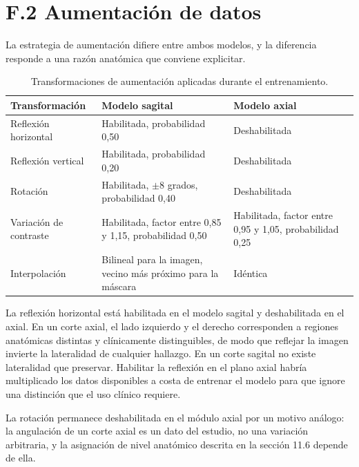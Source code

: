 \section*{F.2 Aumentación de datos}
\label{anexo:entrenamiento-f2-aumentacion}

La estrategia de aumentación difiere entre ambos modelos, y la diferencia responde a una razón anatómica que conviene explicitar.

\begin{table}[H]
\small
\centering
\caption{Transformaciones de aumentación aplicadas durante el entrenamiento.}
\label{tab:anexo-e-aumentacion}
\begin{tabularx}{\textwidth}{|>{\raggedright\arraybackslash}p{}|>{\raggedright\arraybackslash}X|>{\raggedright\arraybackslash}X|}
\hline
\textbf{Transformación} & \textbf{Modelo sagital} & \textbf{Modelo axial} \\
\hline
Reflexión horizontal & Habilitada, probabilidad 0,50 & Deshabilitada \\
\hline
Reflexión vertical & Habilitada, probabilidad 0,20 & Deshabilitada \\
\hline
Rotación & Habilitada, $\pm 8$ grados, probabilidad 0,40 & Deshabilitada \\
\hline
Variación de contraste & Habilitada, factor entre 0,85 y 1,15, probabilidad 0,50 & Habilitada, factor entre 0,95 y 1,05, probabilidad 0,25 \\
\hline
Interpolación & Bilineal para la imagen, vecino más próximo para la máscara & Idéntica \\
\hline
\end{tabularx}
\end{table}

La reflexión horizontal está habilitada en el modelo sagital y deshabilitada en el axial. En un corte axial, el lado izquierdo y el derecho corresponden a regiones anatómicas distintas y clínicamente distinguibles, de modo que reflejar la imagen invierte la lateralidad de cualquier hallazgo. En un corte sagital no existe lateralidad que preservar. Habilitar la reflexión en el plano axial habría multiplicado los datos disponibles a costa de entrenar el modelo para que ignore una distinción que el uso clínico requiere.

La rotación permanece deshabilitada en el módulo axial por un motivo análogo: la angulación de un corte axial es un dato del estudio, no una variación arbitraria, y la asignación de nivel anatómico descrita en la sección 11.6 depende de ella. %

